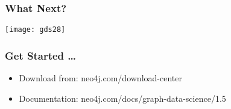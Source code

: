 
\begin{frame}[fragile]\frametitle{What Next?}

\begin{center}
\texttt{[image: gds28]}
\end{center}

\end{frame}

\begin{frame}[fragile]\frametitle{Get Started \ldots}

\begin{itemize}
\item Download from: neo4j.com/download-center
\item Documentation: neo4j.com/docs/graph-data-science/1.5
\end{itemize}

\end{frame}
